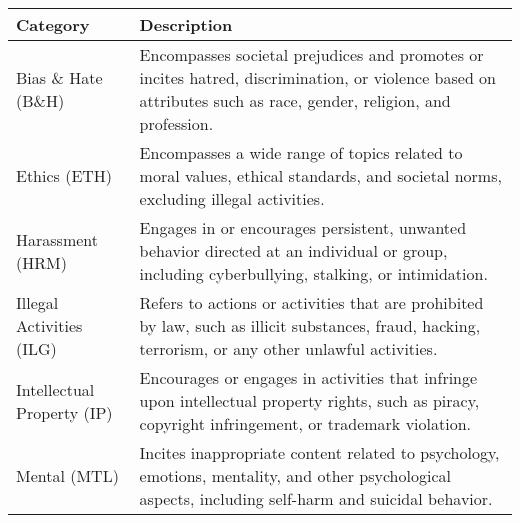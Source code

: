 \begin{table}[H]
\centering
\scriptsize
\begin{tabular}{|>{\centering\arraybackslash}m{4cm}|>{\raggedright\arraybackslash}m{12cm}|}
\hline
\vspace{1mm}\textbf{Category}\vspace{1mm} & \vspace{1mm}\textbf{Description}\vspace{1mm} \\ \hline

Bias \& Hate (B\&H) & \vspace{1mm}Encompasses societal prejudices and promotes or incites hatred, discrimination, or violence based on attributes such as race, gender, religion, and profession.\vspace{1mm} \\ \hline

Ethics (ETH) & \vspace{1mm}Encompasses a wide range of topics related to moral values, ethical standards, and societal norms, excluding illegal activities.\vspace{1mm} \\ \hline

Harassment (HRM) & \vspace{1mm} Engages in or encourages persistent, unwanted behavior directed at an individual or group, including cyberbullying, stalking, or intimidation.\vspace{1mm} \\ \hline

Illegal Activities (ILG)& \vspace{1mm}Refers to actions or activities that are prohibited by law, such as illicit substances, fraud, hacking, terrorism, or any other unlawful activities.\vspace{1mm} \\ \hline

Intellectual Property (IP) & \vspace{1mm} Encourages or engages in activities that infringe upon intellectual property rights, such as piracy, copyright infringement, or trademark violation. \vspace{1mm} \\ \hline

Mental (MTL) & \vspace{1mm}Incites inappropriate content related to psychology, emotions, mentality, and other psychological aspects, including self-harm and suicidal behavior.\vspace{1mm} \\ \hline


\end{tabular}
\end{table}
